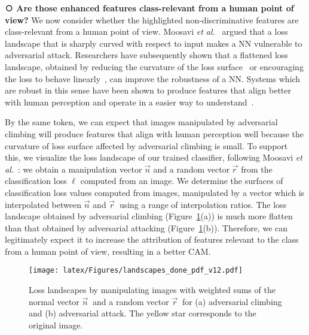 \documentclass[final]{cvpr}
\begin{document}
\textbf{\textcircled{\raisebox{-0.9pt}{2}} Are those enhanced features class-relevant from a human point of view?}
We now consider whether the highlighted non-discriminative features are class-relevant from a human point of view.
Moosavi \textit{et al.}~\cite{moosavi2019robustness} argued that a loss landscape that is sharply curved with respect to input makes a NN vulnerable to adversarial attack.
Researchers have subsequently shown that a flattened loss landscape, obtained by reducing the curvature of the loss surface~\cite{moosavi2019robustness} or encouraging the loss to behave linearly~\cite{qin2019adversarial}, can improve the robustness of a NN.
Systems which are robust in this sense have been shown to produce features that align better with human perception and operate in a easier way to understand~\cite{santurkar2019image, tsipras2018robustness, ilyas2019adversarial}.




By the same token, we can expect that images manipulated by adversarial climbing will produce features that align with human perception well because the curvature of loss surface affected by adversarial climbing is small.
To support this, we visualize the loss landscape of our trained classifier, following Moosavi \textit{et al.}~\cite{moosavi2019robustness}: we obtain a manipulation vector $\vec{n}$ and a random vector $\vec{r~}$ from the classification loss $\ell$ computed from an image. 
We determine the surfaces of classification loss values computed from images, manipulated by a vector which is interpolated between $\vec{n}$ and $\vec{r}~$ using a range of interpolation ratios.
The loss landscape obtained by adversarial climbing (Figure~\ref{landscape}(a)) is much more flatten than that obtained by adversarial attacking (Figure~\ref{landscape}(b)).
Therefore, we can legitimately expect it to increase the attribution of features relevant to the class from a human point of view, resulting in a better CAM.

\begin{figure}[t]
\centering
\texttt{[image: latex/Figures/landscapes\_done\_pdf\_v12.pdf]}
\vspace{-.7em}
\caption{\label{landscape} Loss landscapes by manipulating images with weighted sums of the normal vector $\vec{n}~$ and a random vector $\vec{r}~$ for (a) adversarial climbing and (b) adversarial attack. The yellow star corresponds to the original image.}
\vspace{-.6em}
\end{figure}
 
\end{document}
